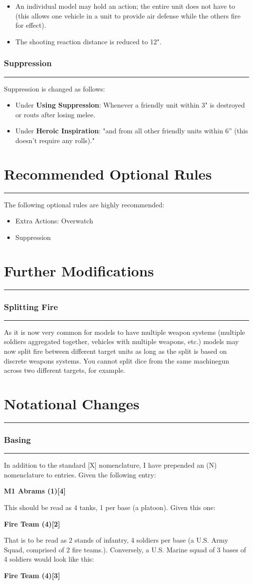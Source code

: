 \documentclass[11pt]{article}
\newcommand{\mysection}[1]{
  \section*{\centering #1}
  \raggedright
  \hrule
  \bigskip

}
\newcommand{\myheading}[1]{
  \subsubsection*{\centering #1}
  \raggedright
  \hrule
}
\begin{document}
\begin{multicols*}{3}[]
\begin{itemize}

\item An individual model may hold an action; the entire unit does not have to
(this allows one vehicle in a unit to provide air defense while the others fire
for effect).
\item The shooting reaction distance is reduced to 12".

\end{itemize}

\myheading{Suppression}

Suppression is changed as follows:

\begin{itemize}
  \item Under {\bf Using Suppression}: Whenever a friendly unit within 3" is
  destroyed or routs after losing melee.
  \item Under {\bf Heroic Inspiration}: "and from all other friendly
  units within 6” (this doesn’t require any rolls)."
\end{itemize}

\mysection{Recommended Optional Rules}

The following optional rules are highly recommended:

\begin{itemize}
  \item Extra Actions: Overwatch
  \item Suppression
\end{itemize}

\mysection{Further Modifications}

\myheading{Splitting Fire}

As it is now very common for models to have multiple weapon systems (multiple
soldiers aggregated together, vehicles with multiple weapons, etc.) models may
now split fire between different target units as long as the split is based on
discrete weapons systems. You cannot split dice from the same machinegun across
two different targets, for example.

\mysection{Notational Changes}

\myheading{Basing}

In addition to the standard [X] nomenclature, I have prepended an (N)
nomenclature to entries. Given the following entry:

{\bf M1 Abrams (1)[4]}

This should be read as 4 tanks, 1 per base (a platoon). Given this one:

{\bf Fire Team (4)[2]}

That is to be read as 2 stands of infantry, 4 soldiers per base (a U.S. Army
Squad, comprised of 2 fire teams.). Conversely, a U.S. Marine squad of 3 bases
of 4 soldiers would look like this:

{\bf Fire Team (4)[3]}

\end{multicols*}
\end{document}
